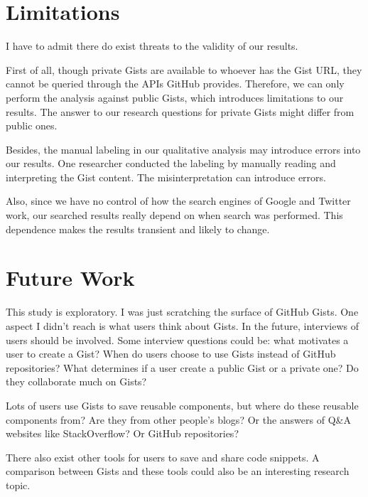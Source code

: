 
\section{Limitations}
I have to admit there do exist threats to the validity of our results. 

First of all, though private Gists are available to whoever has the Gist URL, they cannot be queried through the APIs GitHub provides. Therefore, we can only perform the analysis against public Gists, which introduces limitations to our results. The answer to our research questions for private Gists might differ from public ones.

Besides, the manual labeling in our qualitative analysis may introduce errors into our results. One researcher conducted the labeling by manually reading and interpreting the Gist content. The misinterpretation can introduce errors. 

Also, since we have no control of how the search engines of Google and Twitter work, our searched results really depend on when search was performed. This dependence makes the results transient and likely to change. 

\section{Future Work}

This study is exploratory. I was just scratching the surface of GitHub Gists. One aspect I didn't reach is what users think about Gists. In the future, interviews of users should be involved. Some interview questions could be: what motivates a user to create a Gist? When do users choose to use Gists instead of GitHub repositories? What determines if a user create a public Gist or a private one? Do they collaborate much on Gists?

Lots of users use Gists to save reusable components, but where do these reusable components from? Are they from other people's blogs? Or the answers of Q\&A websites like StackOverflow? Or GitHub repositories? 

There also exist other tools for users to save and share code snippets. A comparison between Gists and these tools could also be an interesting research topic.